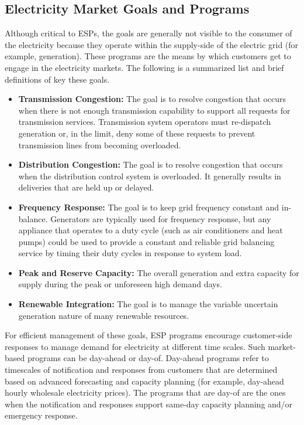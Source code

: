 \subsection{Electricity Market Goals and Programs}
Although critical to ESPs, the goals are generally not visible to the consumer of the electricity because they operate within the supply-side of the electric grid (for example, generation). These programs are the means by which customers get to engage in the electricity markets. The following is a summarized list and brief definitions of key these goals.
\begin{itemize}
\item {\bf Transmission Congestion:} The goal is to resolve congestion that occurs when there is not enough transmission capability to support all requests for transmission services. Transmission system operators must re-dispatch generation or, in the limit, deny some of these requests to prevent transmission lines from becoming overloaded.
\item {\bf Distribution Congestion:} The goal is to resolve congestion that occurs when the distribution control system is overloaded. It generally results in deliveries that are held up or delayed.
\item {\bf Frequency Response:} The goal is to keep grid frequency constant and in-balance. Generators are typically used for frequency response, but any appliance that operates to a duty cycle (such as air conditioners and heat pumps) could be used to provide a constant and reliable grid balancing service by timing their duty cycles in response to system load.
\item {\bf Peak and Reserve Capacity:} The overall generation and extra capacity for supply during the peak or unforeseen high demand days. 
\item {\bf Renewable Integration:} The goal is to manage the variable uncertain generation nature of many renewable resources.
\end{itemize}

For efficient management of these goals, ESP programs encourage customer-side responses to manage demand for electricity at different time scales. Such market-based programs can be day-ahead or day-of. Day-ahead programs refer to timescales of notification and responses from customers that are determined based on advanced forecasting and capacity planning (for example, day-ahead hourly wholesale electricity prices). The programs that are day-of are the ones when the notification and responses support same-day capacity planning and/or emergency response.

